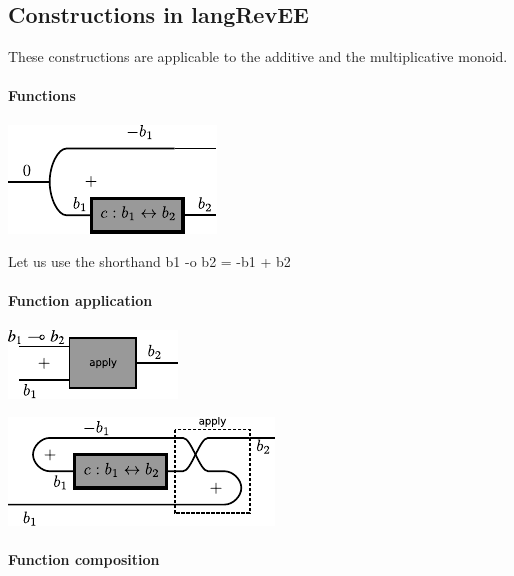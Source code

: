 \documentclass[preprint]{sigplanconf}
\begin{document}
\subsection{Constructions in {{langRevEE}} }
\label{sec:monoidal-constructions}

These constructions are applicable to the additive and the
multiplicative monoid.

\paragraph*{Functions}

\begin{center}
  \includegraphics{diagrams/function.pdf}
\end{center}

Let us use the shorthand {{b1 -o b2 = -b1 + b2}}

\paragraph*{Function application}

\begin{center}
  \includegraphics{diagrams/apply1.pdf}
\end{center}

\begin{center}
  \includegraphics{diagrams/apply2.pdf}
\end{center}

\paragraph*{Function composition}
\end{document}
